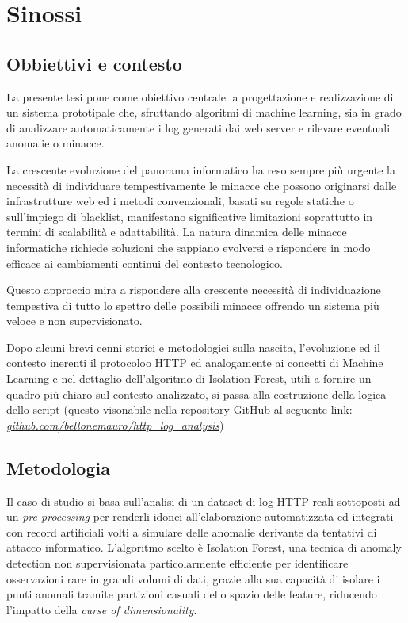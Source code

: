 \chapter*{Sinossi}

\section*{Obbiettivi e contesto}
La presente tesi pone come obiettivo centrale la progettazione e realizzazione di un sistema prototipale che, sfruttando algoritmi di machine learning, sia in grado di analizzare automaticamente i log generati dai web server e rilevare eventuali anomalie o minacce.

La crescente evoluzione del panorama informatico ha reso sempre più urgente la necessità di individuare tempestivamente le minacce che possono originarsi dalle infrastrutture web ed i metodi convenzionali, basati su regole statiche o sull’impiego di blacklist, manifestano significative limitazioni soprattutto in termini di scalabilità e adattabilità. La natura dinamica delle minacce informatiche richiede soluzioni che sappiano evolversi e rispondere in modo efficace ai cambiamenti continui del contesto tecnologico.

Questo approccio mira a rispondere alla crescente necessità di individuazione tempestiva di tutto lo spettro delle possibili minacce offrendo un sistema più veloce e non supervisionato.

Dopo alcuni brevi cenni storici e metodologici sulla nascita, l'evoluzione ed il contesto inerenti il protocoloo HTTP ed analogamente ai concetti di Machine Learning e nel dettaglio dell'algoritmo di Isolation Forest, utili a fornire un quadro più chiaro sul contesto analizzato, si passa alla costruzione della logica dello script (questo visonabile nella repository GitHub al seguente link: \href{https://github.com/bellonemauro/http\_log\_analysis}{\emph{github.com/bellonemauro/http\_log\_analysis}})

\section*{Metodologia}

Il caso di studio si basa sull'analisi di un dataset di log HTTP reali sottoposti ad un \emph{pre-processing} per renderli idonei all'elaborazione automatizzata ed integrati con record artificiali volti a simulare delle anomalie derivante da tentativi di attacco informatico. L'algoritmo scelto è Isolation Forest, una tecnica di anomaly detection non supervisionata particolarmente efficiente per identificare osservazioni rare in grandi volumi di dati, grazie alla sua capacità di isolare i punti anomali tramite partizioni casuali dello spazio delle feature, riducendo l'impatto della \emph{curse of dimensionality}.


